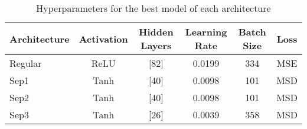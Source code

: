 \begin{table}[!htbp]
    \centering
    \label{tab:exp1_hyperparameters_best_model}
    \caption{Hyperparameters for the best model of each architecture}
    \begin{tabular}{lccccc}
        \toprule
        Architecture & Activation & Hidden Layers & Learning Rate & Batch Size & Loss \\
        \midrule
        Regular &  ReLU & [82] & 0.0199 & 334 & MSE \\
        Sep1    &  Tanh & [40] & 0.0098 & 101 & MSD \\
        Sep2    &  Tanh & [40] & 0.0098 & 101 & MSD \\
        Sep3    &  Tanh & [26] & 0.0039 & 358 & MSD \\
        \bottomrule
    \end{tabular}
\end{table}

